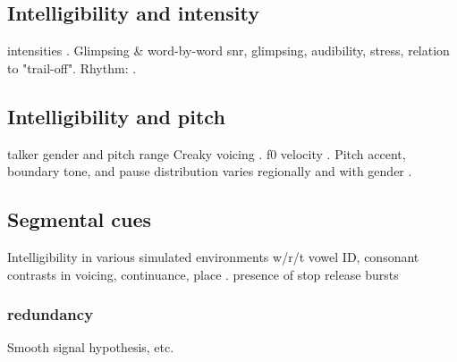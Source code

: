 
\subsection{Intelligibility and intensity\label{sec:IntelIntens}}
intensities \citep{BondMoore1994}.  
Glimpsing \& word-by-word \ac{snr}, glimpsing, audibility, stress, relation to "trail-off".  
Rhythm: \citep{TilsenJohnson2008}. 

\subsection{Intelligibility and pitch}
talker gender and pitch range \citep{BradlowEtAl1996}
Creaky voicing  \citep{xxx}.  
f0 velocity \citep{GauthierEtAl2007b, GauthierEtAl2007a, GauthierEtAl2009}.  
Pitch accent, boundary tone, and pause distribution varies regionally and with gender \citep{ClopperSmiljanic2011}.

\subsection{Segmental cues}
Intelligibility in various simulated environments w/r/t vowel ID, consonant contrasts in voicing, continuance, place \citep{CoxEtAl1987}.  
presence of stop release bursts \citep{PichenyEtAl1986, LiLoizou2008}

\subsubsection{redundancy}
Smooth signal hypothesis, etc.

